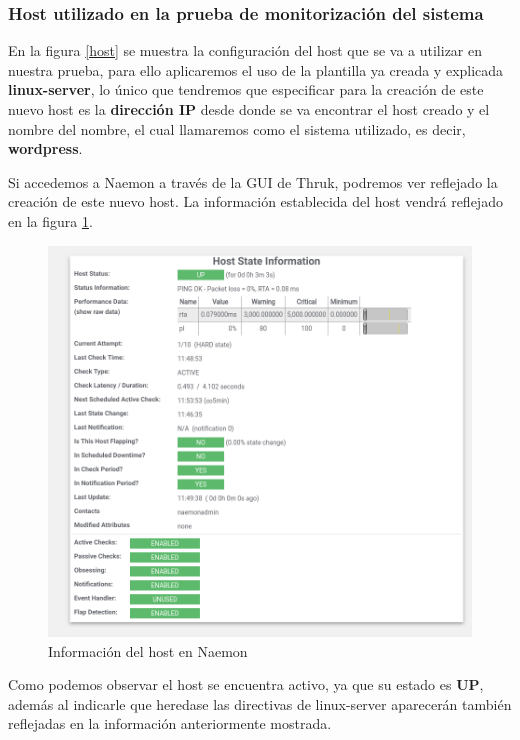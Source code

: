 \subsubsection{Host utilizado en la prueba de monitorización del sistema}

En la figura \ref{host} se muestra la configuración del host que se va a utilizar en nuestra prueba, para ello aplicaremos el uso de la plantilla ya creada y explicada \textbf{linux-server}, lo único que tendremos que especificar para la creación de este nuevo host es la \textbf{dirección IP} desde donde se va encontrar el host creado y el nombre del nombre, el cual llamaremos como el sistema utilizado, es decir, \textbf{wordpress}.

Si accedemos a Naemon a través de la GUI de Thruk, podremos ver reflejado la creación de este nuevo host. La información establecida del host vendrá reflejado en la figura \ref{wordpresshost}.
\begin{figure}[H]
	\centering
	\includegraphics[scale=0.3]{imagenes/wordpress/analisis_naemon/wordpress_host.png}
	\caption{Información del host en Naemon} \label{wordpresshost}
\end{figure}
\newpage
Como podemos observar el host se encuentra activo, ya que su estado es \textbf{UP}, además al indicarle que heredase las directivas de linux-server aparecerán también reflejadas en la información anteriormente mostrada.

